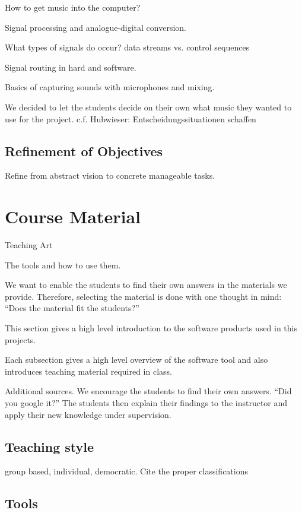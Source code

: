 \documentclass[onecolumn,nocopyrightspace,preprint]{sigplanconf}
\begin{document}
How to get music into the computer?

Signal processing and analogue-digital conversion.

What types of signals do occur? data streams vs. control sequences

Signal routing in hard and software.

Basics of capturing sounds with microphones and mixing.



We decided to let the students decide on their own what music they wanted to use for the project.
c.f. Hubwieser: Entscheidungssituationen schaffen


\subsection{Refinement of Objectives}

Refine from abstract vision to concrete manageable tasks.


\section{Course Material}\label{sec:material}

Teaching Art~\cite{book:Peez2008}

The tools and how to use them.

We want to enable the students to find their own answers in the materials
we provide. Therefore, selecting the material is done with one thought
in mind: ``Does the material fit the students?''

This section gives a high level introduction to the software products
used in this projects.

Each subsection gives a high level overview of the software tool and
also introduces teaching material required in class.

Additional sources. We encourage the students to find their own answers.
``Did you google it?''
The students then explain their findings to the instructor and apply their
new knowledge under supervision.


\subsection{Teaching style}
group based, individual, democratic. Cite the proper classifications~\cite{book:Hubwieser2007}



\subsection{Tools}
\end{document}

